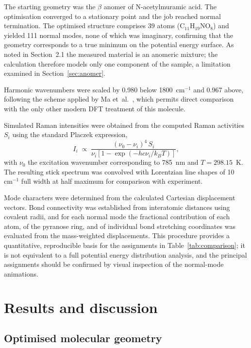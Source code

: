 \documentclass[11pt,a4paper]{article}
\newcommand{\wn}{\ensuremath{\mathrm{cm}^{-1}}}
\begin{document}
The starting geometry was the $\beta$ anomer of N-acetylmuramic acid. The
optimisation converged to a stationary point and the job reached normal
termination. The optimised structure comprises 39 atoms
(C$_{11}$H$_{19}$NO$_8$) and yielded 111 normal modes, none of which was
imaginary, confirming that the geometry corresponds to a true minimum on the
potential energy surface. As noted in Section~2.1 the measured material is an
anomeric mixture; the calculation therefore models only one component of the
sample, a limitation examined in Section~\ref{sec:anomer}.

Harmonic wavenumbers were scaled by 0.980 below 1800~\wn{} and 0.967 above,
following the scheme applied by Ma et~al.\ \cite{ma2024ecoli}, which permits
direct comparison with the only other modern DFT treatment of this molecule.

Simulated Raman intensities were obtained from the computed Raman activities
$S_i$ using the standard Placzek expression,
\begin{equation}
I_i \;\propto\; \frac{(\nu_0-\nu_i)^4\,S_i}
{\nu_i\left[1-\exp\!\left(-hc\nu_i/k_BT\right)\right]},
\end{equation}
with $\nu_0$ the excitation wavenumber corresponding to 785~nm and
$T = 298.15$~K. The resulting stick spectrum was convolved with Lorentzian
line shapes of 10~\wn{} full width at half maximum for comparison with
experiment.

Mode characters were determined from the calculated Cartesian displacement
vectors. Bond connectivity was established from interatomic distances using
covalent radii, and for each normal mode the fractional contribution of each
atom, of the pyranose ring, and of individual bond stretching coordinates was
evaluated from the mass-weighted displacements. This procedure provides a
quantitative, reproducible basis for the assignments in
Table~\ref{tab:comparison}; it is not equivalent to a full potential energy
distribution analysis, and the principal assignments should be confirmed by
visual inspection of the normal-mode animations.

\section{Results and discussion}

\subsection{Optimised molecular geometry}
\end{document}

